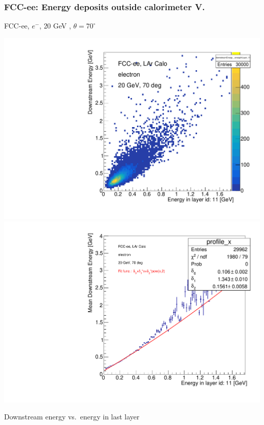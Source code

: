 \documentclass[aspectratio=169]{beamer}
\newcommand{\bluetext}[1]{%
  \textcolor{myBlue}{#1}
}
\newcommand{\redtext}[1]{%
  \textcolor{myRed}{#1}
}
\begin{document}
\begin{frame}
  \frametitle{FCC-ee: Energy deposits outside calorimeter V.}

  \centering
  FCC-ee, $e^{-}$, \redtext{20 GeV}, \bluetext{$\theta = 70^{\circ}$} \\[1.5ex]
  \begin{adjustwidth}{-5mm}{-5mm}
    \includegraphics[width=0.49\linewidth]{figures/2d/hist_downstream_vs_layer_11_70deg_20GeV.pdf}
    \includegraphics[width=0.49\linewidth]{figures/2d/profile_downstream_vs_layer_11_70deg_20GeV.pdf}
  \end{adjustwidth}
  \redtext{Downstream} energy vs.\ energy in last layer
\end{frame}
\end{document}
